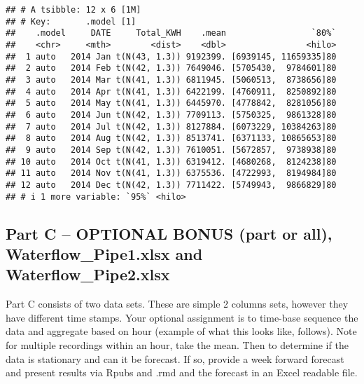 \documentclass[
]{article}
\begin{document}
\begin{verbatim}
## # A tsibble: 12 x 6 [1M]
## # Key:       .model [1]
##    .model     DATE     Total_KWH    .mean                 `80%`
##    <chr>     <mth>        <dist>    <dbl>                <hilo>
##  1 auto   2014 Jan t(N(43, 1.3)) 9192399. [6939145, 11659335]80
##  2 auto   2014 Feb t(N(42, 1.3)) 7649046. [5705430,  9784601]80
##  3 auto   2014 Mar t(N(41, 1.3)) 6811945. [5060513,  8738656]80
##  4 auto   2014 Apr t(N(41, 1.3)) 6422199. [4760911,  8250892]80
##  5 auto   2014 May t(N(41, 1.3)) 6445970. [4778842,  8281056]80
##  6 auto   2014 Jun t(N(42, 1.3)) 7709113. [5750325,  9861328]80
##  7 auto   2014 Jul t(N(42, 1.3)) 8127884. [6073229, 10384263]80
##  8 auto   2014 Aug t(N(42, 1.3)) 8513741. [6371133, 10865653]80
##  9 auto   2014 Sep t(N(42, 1.3)) 7610051. [5672857,  9738938]80
## 10 auto   2014 Oct t(N(41, 1.3)) 6319412. [4680268,  8124238]80
## 11 auto   2014 Nov t(N(41, 1.3)) 6375536. [4722993,  8194984]80
## 12 auto   2014 Dec t(N(42, 1.3)) 7711422. [5749943,  9866829]80
## # i 1 more variable: `95%` <hilo>
\end{verbatim}

\subsection{Part C -- OPTIONAL BONUS (part or all),
Waterflow\_Pipe1.xlsx and
Waterflow\_Pipe2.xlsx}\label{part-c-optional-bonus-part-or-all-waterflow_pipe1.xlsx-and-waterflow_pipe2.xlsx}

Part C consists of two data sets. These are simple 2 columns sets,
however they have different time stamps. Your optional assignment is to
time-base sequence the data and aggregate based on hour (example of what
this looks like, follows). Note for multiple recordings within an hour,
take the mean. Then to determine if the data is stationary and can it be
forecast. If so, provide a week forward forecast and present results via
Rpubs and .rmd and the forecast in an Excel readable file.
\end{document}
